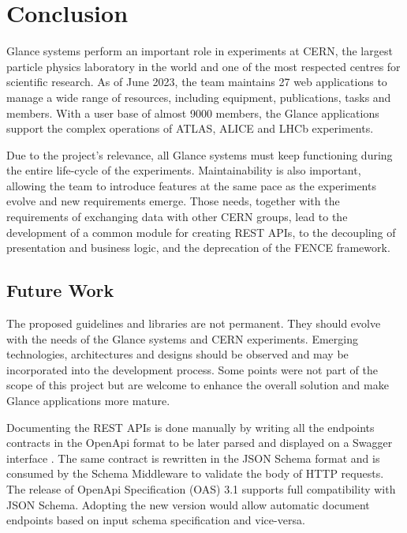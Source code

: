 \chapter{Conclusion}
\label{chap7}

Glance systems perform an important role in experiments at CERN, the largest particle physics laboratory in the world and one of the most respected centres for scientific research. As of June 2023, the team maintains 27 web applications to manage a wide range of resources, including equipment, publications, tasks and members. With a user base of almost 9000 members, the Glance applications support the complex operations of ATLAS, ALICE and LHCb experiments.

Due to the project's relevance, all Glance systems must keep functioning during the entire life-cycle of the experiments. Maintainability is also important, allowing the team to introduce features at the same pace as the experiments evolve and new requirements emerge. Those needs, together with the requirements of exchanging data with other CERN groups, lead to the development of a common module for creating REST APIs, to the decoupling of presentation and business logic, and the deprecation of the FENCE framework.


\section{Future Work}

The proposed guidelines and libraries are not permanent. They should evolve with the needs of the Glance systems and CERN experiments. Emerging technologies, architectures and designs should be observed and may be incorporated into the development process. Some points were not part of the scope of this project but are welcome to enhance the overall solution and make Glance applications more mature.

Documenting the REST APIs is done manually by writing all the endpoints contracts in the OpenApi \cite{open-api} format to be later parsed and displayed on a Swagger interface \cite{swagger-ui}. The same contract is rewritten in the JSON Schema \cite{json-schema-spec} format and is consumed by the Schema Middleware \cite{schema-middleware} to validate the body of HTTP requests. The release of OpenApi Specification (OAS) 3.1 \cite{oas-3.1} supports full compatibility with JSON Schema. Adopting the new version would allow automatic document endpoints based on input schema specification and vice-versa.

